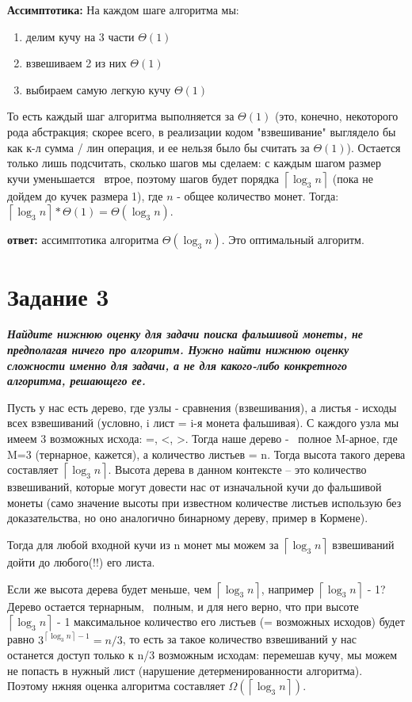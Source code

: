 \documentclass{article}
\begin{document}
\medskip

\textbf{Ассимптотика:} На каждом шаге алгоритма мы:
\begin{enumerate}
    \item делим кучу на 3 части $\Theta(1)$
    \item взвешиваем 2 из них $\Theta(1)$
    \item выбираем самую легкую кучу $\Theta(1)$
\end{enumerate}

То есть каждый шаг алгоритма выполняется за $\Theta(1)$ (это, конечно, некоторого рода абстракция; скорее всего, в реализации кодом "взвешивание" выглядело бы как к-л сумма / лин операция, и ее нельзя было бы считать за $\Theta(1)$). Остается только лишь подсчитать, сколько шагов мы сделаем: с каждым шагом размер кучи уменьшается ~втрое, поэтому шагов будет порядка $\left\lceil \log_3n \right\rceil$ (пока не дойдем до кучек размера 1), где $n$ - общее количество монет. Тогда: $\left\lceil \log_3n \right\rceil * \Theta(1) = \Theta(\log_3 n)$.

\textbf{ответ:} ассимптотика алгоритма $\Theta(\log_3 n)$. Это оптимальный алгоритм.

\bigskip


\section*{\textbf{Задание 3}} \textbf{\textit{Найдите нижнюю оценку для задачи поиска фальшивой монеты, не предполагая ничего про алгоритм. Нужно найти нижнюю оценку сложности именно для задачи, а не для какого-либо конкретного алгоритма, решающего ее.}}

Пусть у нас есть дерево, где узлы - сравнения (взвешивания), а листья - исходы всех взвешиваний (условно, i лист = i-я монета фальшивая). С каждого узла мы имеем 3 возможных исхода: =, <, >. Тогда наше дерево - ~полное M-арное, где M=3 (тернарное, кажется), а количество листьев = n. Тогда высота такого дерева составляет $\left\lceil \log_3n \right\rceil$. Высота дерева в данном контексте -- это количество взвешиваний, которые могут довести нас от изначальной кучи до фальшивой монеты (само значение высоты при известном количестве листьев использую без доказательства, но оно аналогично бинарному дереву, пример в Кормене). 

Тогда для любой входной кучи из n монет мы можем за $\left\lceil \log_3n \right\rceil$ взвешиваний дойти до любого(!!) его листа. 

Если же высота  дерева будет меньше, чем  $\left\lceil \log_3n \right\rceil$, например $\left\lceil \log_3n \right\rceil$ - 1? Дерево остается тернарным, ~полным, и для него верно, что при высоте $\left\lceil \log_3n \right\rceil$ - 1 максимальное количество его листьев (= возможных исходов) будет равно $3^{\left\lceil \log_3n \right\rceil - 1} = n / 3$, то есть за такое количество взвешиваний у нас останется доступ только к n/3 возможным исходам: перемешав кучу, мы можем не попасть в нужный лист (нарушение детерменированности алгоритма).  Поэтому нжняя оценка алгоритма составляет $\Omega(\left\lceil \log_3n \right\rceil)$. 
\end{document}
